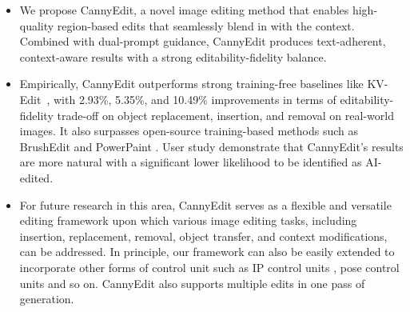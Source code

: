 \documentclass{article}
\begin{document}
\vspace{-1mm}
\begin{itemize}[leftmargin=5mm]
\item We propose CannyEdit, a novel image editing method 
that enables high-quality region-based edits that seamlessly blend in with the context. Combined with dual-prompt guidance, CannyEdit produces text-adherent, context-aware results with a strong editability-fidelity balance.

\vspace{-1mm}

\item Empirically, CannyEdit outperforms strong training-free baselines like KV-Edit~\citep{zhu2025kv}, with 2.93\%, 5.35\%, and 10.49\% improvements in terms of editability-fidelity trade-off on object replacement, insertion, and removal on real-world images. It also surpasses open-source training-based methods such as BrushEdit \citep{li2024brushedit} and PowerPaint \citep{zhuang2023task}. User study  demonstrate that CannyEdit's results are more natural with a significant lower likelihood to be identified as AI-edited.  %

\vspace{-1mm}

\item For future research in this area, CannyEdit serves as a flexible and versatile editing framework upon which various image editing tasks, including insertion, replacement, removal, object transfer, and context modifications, can be addressed. {In principle, our framework can also be easily extended to incorporate other forms of control unit such as IP control units \cite{ye2023ip,wang2024instantid}, pose control units \cite{wang2024stablepose,buchheim2025controlling} and so on. CannyEdit also supports multiple edits in one pass of generation.} 

\end{itemize}
\end{document}
